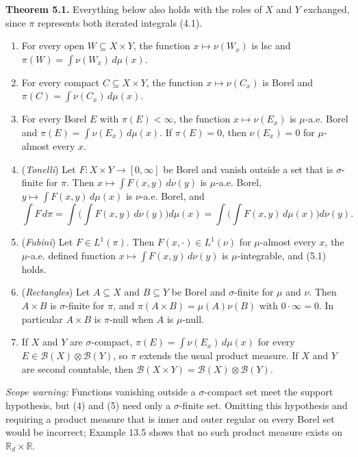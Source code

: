 \documentclass[
  english,
  11pt,
  a4paper,
]{article}
\providecommand{\tightlist}{%
  \setlength{\itemsep}{0pt}\setlength{\parskip}{0pt}}
\begin{document}
\textbf{Theorem 5.1.} Everything below also holds with the roles of
\(X\) and \(Y\) exchanged, since \(\pi\) represents both iterated
integrals (4.1).

\begin{enumerate}
\tightlist
\item
  For every open \(W\subseteq X\times Y\), the function
  \(x\mapsto\nu(W_x)\) is lsc and \(\pi(W)=\int\nu(W_x)\,d\mu(x)\).
\item
  For every compact \(C\subseteq X\times Y\), the function
  \(x\mapsto\nu(C_x)\) is Borel and \(\pi(C)=\int\nu(C_x)\,d\mu(x)\).
\item
  For every Borel \(E\) with \(\pi(E)<\infty\), the function
  \(x\mapsto\nu(E_x)\) is \(\mu\)-a.e. Borel and
  \(\pi(E)=\int\nu(E_x)\,d\mu(x)\). If \(\pi(E)=0\), then \(\nu(E_x)=0\)
  for \(\mu\)-almost every \(x\).
\item
  (\emph{Tonelli}) Let \(F\colon X\times Y\to[0,\infty]\) be Borel and
  vanish outside a set that is \(\sigma\)-finite for \(\pi\). Then
  \(x\mapsto\int F(x,y)\,d\nu(y)\) is \(\mu\)-a.e. Borel,
  \(y\mapsto\int F(x,y)\,d\mu(x)\) is \(\nu\)-a.e. Borel, and
  \[\int F\,d\pi=\int\Big(\int F(x,y)\,d\nu(y)\Big)d\mu(x)=\int\Big(\int F(x,y)\,d\mu(x)\Big)d\nu(y).
  \tag{5.1}\]
\item
  (\emph{Fubini}) Let \(F\in L^1(\pi)\). Then \(F(x,\cdot)\in L^1(\nu)\)
  for \(\mu\)-almost every \(x\), the \(\mu\)-a.e. defined function
  \(x\mapsto\int F(x,y)\,d\nu(y)\) is \(\mu\)-integrable, and (5.1)
  holds.
\item
  (\emph{Rectangles}) Let \(A\subseteq X\) and \(B\subseteq Y\) be Borel
  and \(\sigma\)-finite for \(\mu\) and \(\nu\). Then \(A\times B\) is
  \(\sigma\)-finite for \(\pi\), and \(\pi(A\times B)=\mu(A)\nu(B)\)
  with \(0\cdot\infty=0\). In particular \(A\times B\) is \(\pi\)-null
  when \(A\) is \(\mu\)-null.
\item
  If \(X\) and \(Y\) are \(\sigma\)-compact,
  \(\pi(E)=\int\nu(E_x)\,d\mu(x)\) for every
  \(E\in\mathcal B(X)\otimes\mathcal B(Y)\), so \(\pi\) extends the
  usual product measure. If \(X\) and \(Y\) are second countable, then
  \(\mathcal B(X\times Y)=\mathcal B(X)\otimes\mathcal B(Y)\).
\end{enumerate}

\emph{Scope warning:} Functions vanishing outside a \(\sigma\)-compact
set meet the support hypothesis, but (4) and (5) need only a
\(\sigma\)-finite set. Omitting this hypothesis and requiring a product
measure that is inner and outer regular on every Borel set would be
incorrect; Example 13.5 shows that no such product measure exists on
\(\mathbb R_d\times\mathbb R\).
\end{document}
